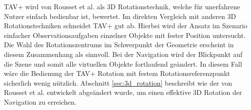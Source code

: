 TAV+ wird von Rousset et al. als 3D Rotationstechnik, welche für unerfahrene Nutzer einfach bedienbar ist, bewertet. Im direkten Vergleich mit anderen 3D Rotationstechniken schneidet TAV+ gut ab. Hierbei wird der Ansatz im Szenario einfacher Observationsaufgaben einzelner Objekte mit fester Position untersucht. Die Wahl des Rotationszentrums im Schwerpunkt der Geometrie erscheint in diesem Zusammenhang als sinnvoll. Bei der Navigation wird der Blickpunkt auf die Szene und somit alle virtuellen Objekte fortlaufend geändert. In diesem Fall wäre die Bedienung der TAV+ Rotation mit festem Rotationsreferenzpunkt sicherlich wenig nützlich. Abschnitt \ref{sec:3d_rotation} beschreibt wie der von Rousset et al. entwickelt abgeändert wurde, um einen effektive 3D Rotation der Navigation zu erreichen.
